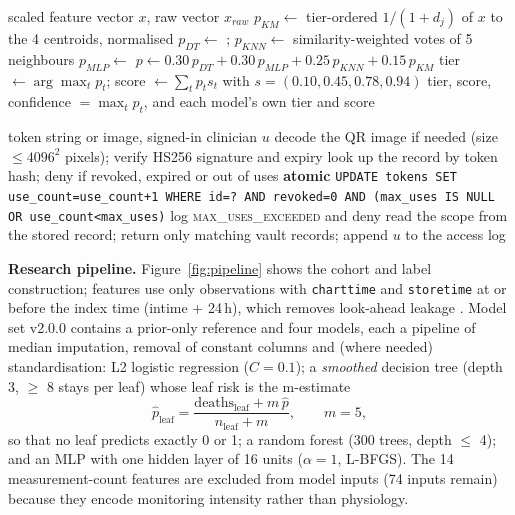 \begin{algorithm}[H]
\caption{Ensemble fusion (\texttt{EnsembleClinicalPredictor.predict})}
\label{alg:fusion}
\begin{algorithmic}[1]
\Require scaled feature vector $x$, raw vector $x_{raw}$
\State $p_{KM}\gets$ tier-ordered $1/(1+d_j)$ of $x$ to the 4 centroids, normalised
\State $p_{DT}\gets$ ;\; $p_{KNN}\gets$ similarity-weighted votes of 5 neighbours
\State $p_{MLP}\gets$ 
\State $p\gets 0.30\,p_{DT}+0.30\,p_{MLP}+0.25\,p_{KNN}+0.15\,p_{KM}$
\State tier $\gets \arg\max_t p_t$;\; score $\gets \sum_t p_t s_t$ with $s=(0.10,0.45,0.78,0.94)$
\State \Return tier, score, confidence $=\max_t p_t$, and each model's own tier and score
\end{algorithmic}
\end{algorithm}

\begin{algorithm}[H]
\caption{QR pass redemption (\texttt{access\_vault\_with\_token})}
\label{alg:qr}
\begin{algorithmic}[1]
\Require token string or image, signed-in clinician $u$
\State decode the QR image if needed (size $\le 4096^2$ pixels); verify HS256 signature and expiry
\State look up the record by token hash; deny if revoked, expired or out of uses
\State \textbf{atomic} \texttt{UPDATE tokens SET use\_count=use\_count+1 WHERE id=? AND revoked=0 AND (max\_uses IS NULL OR use\_count<max\_uses)}
 log \textsc{max\_uses\_exceeded} and deny \EndIf
\State read the scope from the stored record; return only matching vault records; append $u$ to the access log
\end{algorithmic}
\end{algorithm}

\textbf{Research pipeline.} Figure~\ref{fig:pipeline} shows the cohort and label construction; features
use only observations with \texttt{charttime} and \texttt{storetime} at or before the index time
(intime + 24\,h), which removes look-ahead leakage \cite{kaufman2012leakage}. Model set v2.0.0 contains a
prior-only reference and four models, each a pipeline of median imputation, removal of constant columns
and (where needed) standardisation: L2 logistic regression ($C=0.1$); a \emph{smoothed} decision tree
(depth 3, $\ge$ 8 stays per leaf) whose leaf risk is the m-estimate
\begin{equation}
\hat p_{\text{leaf}}=\frac{\text{deaths}_{\text{leaf}}+m\,\hat p}{n_{\text{leaf}}+m},\qquad m=5,
\end{equation}
so that no leaf predicts exactly 0 or 1; a random forest (300 trees, depth $\le$ 4); and an MLP with one
hidden layer of 16 units ($\alpha=1$, L-BFGS). The 14 measurement-count features are excluded from model
inputs (74 inputs remain) because they encode monitoring intensity rather than physiology.

